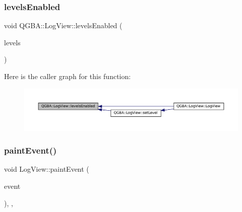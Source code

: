 \subsubsection{\texorpdfstring{levels\+Enabled}{levelsEnabled}}
{\footnotesize\ttfamily void Q\+G\+B\+A\+::\+Log\+View\+::levels\+Enabled (\begin{DoxyParamCaption}\item[{\mbox{\hyperlink{ioapi_8h_a787fa3cf048117ba7123753c1e74fcd6}{int}}}]{levels }\end{DoxyParamCaption})\hspace{0.3cm}{\ttfamily [signal]}}

Here is the caller graph for this function\+:
\nopagebreak
\begin{figure}[H]
\begin{center}
\leavevmode
\includegraphics[width=350pt]{class_q_g_b_a_1_1_log_view_a57c60f4751bc52c34c3126ff5ab8ac27_icgraph}
\end{center}
\end{figure}
\mbox{\label{class_q_g_b_a_1_1_log_view_afba18823777f16c5423e19a2b5379e82}} 
\subsubsection{\texorpdfstring{paint\+Event()}{paintEvent()}}
{\footnotesize\ttfamily void Log\+View\+::paint\+Event (\begin{DoxyParamCaption}\item[{Q\+Paint\+Event $\ast$}]{event }\end{DoxyParamCaption})\hspace{0.3cm}{\ttfamily [override]}, {\ttfamily [protected]}, {\ttfamily [virtual]}}

\mbox{\label{class_q_g_b_a_1_1_log_view_ac55c68cf058ed26900803ad7bec30445}} 
